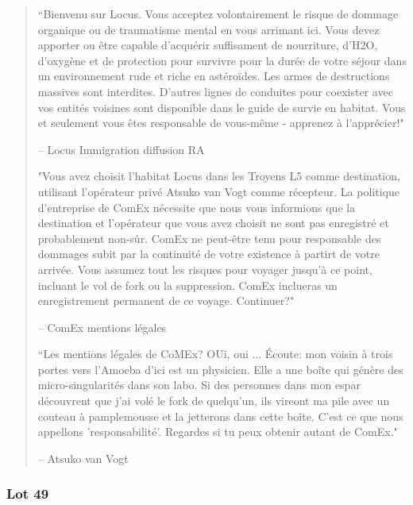                                                                \begin{quotation} “Bienvenu sur Locus. Vous acceptez volontairement le risque de dommage organique ou de traumatisme mental en vous arrimant ici. Vous devez apporter ou être capable d'acquérir suffisament de nourriture, d'H2O, d'oxygène et de protection pour survivre pour la durée de votre séjour dans un environnement rude et riche en astéroïdes. Les armes de destructions massives sont interdites. D'autres lignes de conduites pour coexister avec vos entités voisines sont disponible dans le guide de survie en habitat. Vous et seulement vous êtes responsable de vous-même - apprenez à l'apprécier!" 

                                                                  -- Locus Immigration diffusion RA 

                                                                  "Vous avez choisit l'habitat Locus dans les Troyens L5 comme destination, utilisant l'opérateur privé Atsuko van Vogt comme récepteur. La politique d'entreprise de ComEx nécessite que nous vous informions que la destination et l'opérateur que vous avez choisit ne sont pas enregistré et probablement non-sûr. ComEx ne peut-être tenu pour responsable des dommages subit par la continuité de votre existence à partirt de votre arrivée. Vous assumez tout les risques pour voyager jusqu'à ce point, incluant le vol de fork ou la suppression. ComEx inclueras un enregistrement permanent de ce voyage. Continuer?" 

                                                                  -- ComEx mentions légales 

                                                                  “Les mentions légales de CoMEx? OUi, oui ... Écoute: mon voisin à trois portes vers l'Amoeba d'ici est un physicien. Elle a une boîte qui génère des micro-singularités dans son labo. Si des personnes dans mon espar découvrent que j'ai volé le fork de quelqu'un, ils vireont ma pile avec un couteau à pamplemousse et la jetterons dans cette boîte. C'est ce que nous appellons 'responsabilité'. Regardes si tu peux obtenir autant de ComEx." 

                                                                  -- Atsuko van Vogt \end{quotation} 

                                                                  \subsubsection{Lot 49} \label{sec:lot-49} 

